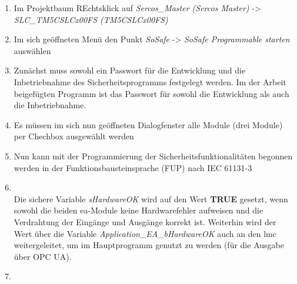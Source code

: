 \documentclass[../../../Bachelorarbeit.tex]{subfiles}
\begin{document}
\begin{enumerate}
    \item Im Projektbaum REchtsklick auf \textit{Sercos\_Master (Sercos Master)} -> \\ \textit{SLC\_TM5CSLCx00FS (TM5CSLCx00FS)}
    \item Im sich geöffneten Menü den Punkt \textit{SoSafe} -> \textit{SoSafe Programmable starten} auswählen
    \item Zunächst muss sowohl ein Passwort für die Entwicklung und die Inbetriebnahme des Sicherheitsprogramms festgelegt werden. Im der Arbeit beigefügten Programm ist das Passwort  für sowohl die Entwicklung als auch die Inbetriebnahme.
    \item Es müssen im sich nun geöffneten Dialogfenster alle Module (drei Module) per Chechbox ausgewählt werden
    \item Nun kann mit der Programmierung der Sicherheitsfunktionalitäten begonnen werden in der Funktionsbausteinsprache (FUP) nach IEC 61131-3
    \item \begin{minipage}[t]{\linewidth}
        \raggedright
        \label{fig:my-img41}
    \end{minipage}
    \bigskip \\
    Die sichere Variable \textit{sHardwareOK} wird auf den Wert \textbf{TRUE} gesetzt, wenn sowohl die beiden \acs{ea}-Module keine Hardwarefehler aufweisen und die Verdrahtung der Eingänge und Ausgänge korrekt ist. Weiterhin wird der Wert über die Variable \textit{Application\_EA\_bHardwareOK} auch an den \acs{lmc} weitergeleitet, um im Hauptprogramm genutzt zu werden (\zB für die Ausgabe über OPC UA).
    \item \begin{minipage}[t]{\linewidth}
        \raggedright
\end{minipage}
\end{enumerate}
\end{document}
